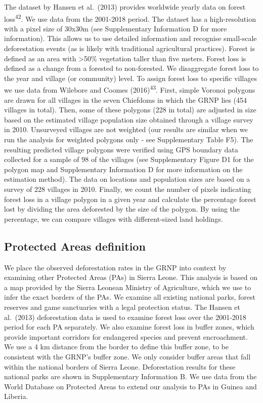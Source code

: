 \documentclass[
]{article}
\begin{document}
The dataset by Hansen et al.~(2013) provides worldwide yearly data on
forest loss\textsuperscript{42}. We use data from the 2001-2018 period.
The dataset has a high-resolution with a pixel size of 30x30m (see
Supplementary Information D for more information). This allows us to use
detailed information and recognise small-scale deforestation events (as
is likely with traditional agricultural practices). Forest is defined as
an area with \textgreater50\% vegetation taller than five meters. Forest
loss is defined as a change from a forested to non-forested. We
disaggregate forest loss to the year and village (or community) level.
To assign forest loss to specific villages we use data from Wilebore and
Coomes (2016)\textsuperscript{43}. First, simple Voronoi polygons are
drawn for all villages in the seven Chiefdoms in which the GRNP lies
(454 villages in total). Then, some of these polygons (228 in total) are
adjusted in size based on the estimated village population size obtained
through a village survey in 2010. Unsurveyed villages are not weighted
(our results are similar when we run the analysis for weighted polygons
only - see Supplementary Table F5). The resulting predicted village
polygons were verified using GPS boundary data collected for a sample of
98 of the villages (see Supplementary Figure D1 for the polygon map and
Supplementary Information D for more information on the estimation
method). The data on locations and population sizes are based on a
survey of 228 villages in 2010. Finally, we count the number of pixels
indicating forest loss in a village polygon in a given year and
calculate the percentage forest lost by dividing the area deforested by
the size of the polygon. By using the percentage, we can compare
villages with different-sized land holdings.

\hypertarget{protected-areas-definition}{%
\subsection{Protected Areas
definition}\label{protected-areas-definition}}

We place the observed deforestation rates in the GRNP into context by
examining other Protected Areas (PAs) in Sierra Leone. This analysis is
based on a map provided by the Sierra Leonean Ministry of Agriculture,
which we use to infer the exact borders of the PAs. We examine all
existing national parks, forest reserves and game sanctuaries with a
legal protection status. The Hansen et al.~(2013) deforestation data is
used to examine forest loss over the 2001-2018 period for each PA
separately. We also examine forest loss in buffer zones, which provide
important corridors for endangered species and prevent encroachment. We
use a 4 km distance from the border to define this buffer zone, to be
consistent with the GRNP's buffer zone. We only consider buffer areas
that fall within the national borders of Sierra Leone. Deforestation
results for these national parks are shown in Supplementary Information
B. We use data from the World Database on Protected Areas to extend our
analysis to PAs in Guinea and Liberia.
\end{document}
